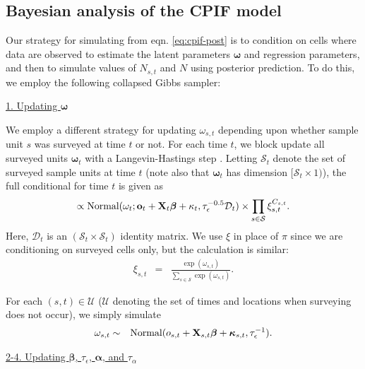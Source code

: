 \documentclass[12pt,fleqn]{article}
\begin{document}
\begin{flushleft}
\subsection{Bayesian analysis of the CPIF model}

Our strategy for simulating from eqn. \ref{eq:cpif-post} is to condition on cells where data are observed to estimate the latent parameters $\boldsymbol{\omega}$ and regression parameters, and then to simulate values of $N_{s,t}$ and $N$ using posterior prediction.   To do this, we employ the following collapsed Gibbs sampler:

\underline{1. Updating $\boldsymbol{\omega}$}

We employ a different strategy for updating $\omega_{s,t}$ depending upon whether sample unit $s$ was surveyed at time $t$ or not.  For each time $t$, we block update all surveyed units $\boldsymbol{\omega}_{t}$ with a Langevin-Hastings step \citep[see e.g.][section 7.1.4]{GivensHoeting2005}.  Letting $\mathcal{S}_t$ denote the set of surveyed sample units at time $t$ (note also that $\boldsymbol{\omega}_t$ has dimension $[\mathcal{S}_t \times 1)$), the full conditional for time $t$ is given as
\begin{equation*}
  [\boldsymbol{\omega}_{t} | \cdot] \propto \textrm{Normal}(\omega_t;{\bf o}_t + {\bf X}_{t} \boldsymbol{\beta} + \kappa_{t}, \tau_\epsilon^{-0.5} \mathcal{D}_t) \times \prod_{s \in \mathcal{S}} \xi_{s,t}^{C_{s,t}}.
\end{equation*}
Here, $\mathcal{D}_t$ is an $(\mathcal{S}_t \times \mathcal{S}_t)$ identity matrix.  We use $\xi$ in place of $\pi$ since we are conditioning on surveyed cells only, but the calculation is similar:
\begin{eqnarray*}
  \xi_{s,t} & = & \frac{ \exp(\omega_{s,t})}{\sum_{s \in \mathcal{S}} \exp(\omega_{s,t})}.
\end{eqnarray*}


\hspace{.5in} For each $(s,t) \in \mathcal{U}$ ($\mathcal{U}$ denoting the set of times and locations when surveying does not occur), we simply simulate
\begin{eqnarray*}
  \omega_{s,t} & \sim & \textrm{Normal}(o_{s,t} + {\bf X}_{s,t} \boldsymbol{\beta} + \boldsymbol{\kappa}_{s,t}, \tau_\epsilon^{-1}).
\end{eqnarray*}


\underline{2-4. Updating $\boldsymbol{\beta}$, $\tau_\epsilon$, $\boldsymbol{\alpha}$, and $\tau_\alpha$}


\end{flushleft}
\end{document}
